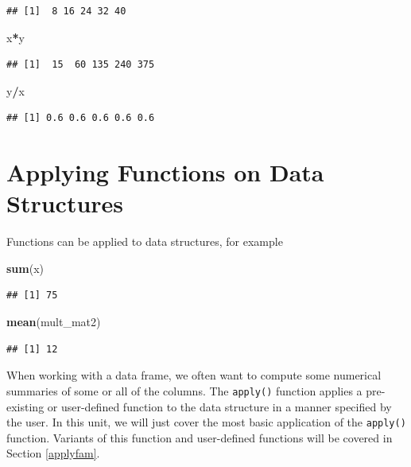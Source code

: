 \documentclass[
]{book}
\newenvironment{Shaded}{\begin{snugshade}}{\end{snugshade}}
\newcommand{\FunctionTok}[1]{\textcolor[rgb]{0.13,0.29,0.53}{\textbf{#1}}}
\newcommand{\NormalTok}[1]{#1}
\newcommand{\SpecialCharTok}[1]{\textcolor[rgb]{0.81,0.36,0.00}{\textbf{#1}}}
\theoremstyle{definition}
\theoremstyle{definition}
\theoremstyle{definition}
\theoremstyle{definition}
\theoremstyle{remark}
\begin{document}
\begin{verbatim}
## [1]  8 16 24 32 40
\end{verbatim}

\begin{Shaded}
\begin{Highlighting}[]
\NormalTok{x}\SpecialCharTok{*}\NormalTok{y}
\end{Highlighting}
\end{Shaded}

\begin{verbatim}
## [1]  15  60 135 240 375
\end{verbatim}

\begin{Shaded}
\begin{Highlighting}[]
\NormalTok{y}\SpecialCharTok{/}\NormalTok{x}
\end{Highlighting}
\end{Shaded}

\begin{verbatim}
## [1] 0.6 0.6 0.6 0.6 0.6
\end{verbatim}

\hypertarget{funcDF}{%
\section{Applying Functions on Data Structures}\label{funcDF}}

Functions can be applied to data structures, for example

\begin{Shaded}
\begin{Highlighting}[]
\FunctionTok{sum}\NormalTok{(x)}
\end{Highlighting}
\end{Shaded}

\begin{verbatim}
## [1] 75
\end{verbatim}

\begin{Shaded}
\begin{Highlighting}[]
\FunctionTok{mean}\NormalTok{(mult\_mat2)}
\end{Highlighting}
\end{Shaded}

\begin{verbatim}
## [1] 12
\end{verbatim}

When working with a data frame, we often want to compute some numerical summaries of some or all of the columns. The \texttt{apply()} function applies a pre-existing or user-defined function to the data structure in a manner specified by the user. In this unit, we will just cover the most basic application of the \texttt{apply()} function. Variants of this function and user-defined functions will be covered in Section \ref{applyfam}.
\end{document}
